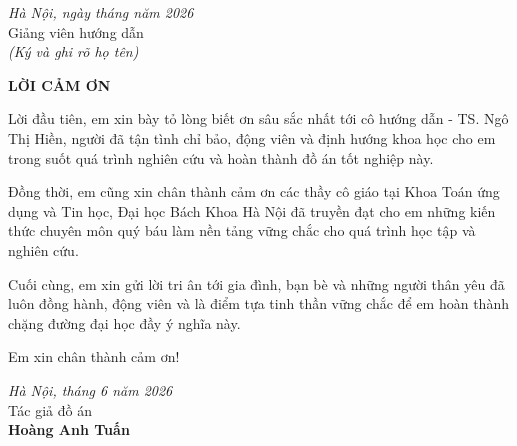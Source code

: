 ﻿\documentclass[../main.tex]{subfiles}
\begin{document}
\hfill
\begin{minipage}[t]{0.5\textwidth}
\noindent
\begin{center}
\vspace{1cm}
\textit{Hà Nội, ngày \hspace{0.5cm} tháng \hspace{0.5cm} năm 2026} \\
Giảng viên hướng dẫn\\
\textit{(Ký và ghi rõ họ tên)}\\ \vspace{3cm}
\end{center}	
\end{minipage}
\pagestyle{fancy}
\fancyhf{}
\fontsize{12pt}{14pt}\selectfont
\newpage
\begin{center}
    \Large{\textbf{LỜI CẢM ƠN}}\\
\end{center}
\vspace{1cm}
Lời đầu tiên, em xin bày tỏ lòng biết ơn sâu sắc nhất tới cô hướng dẫn - TS. Ngô Thị Hiền, người đã tận tình chỉ bảo, động viên và định hướng khoa học cho em trong suốt quá trình nghiên cứu và hoàn thành đồ án tốt nghiệp này.

Đồng thời, em cũng xin chân thành cảm ơn các thầy cô giáo tại Khoa Toán ứng dụng và Tin học, Đại học Bách Khoa Hà Nội đã truyền đạt cho em những kiến thức chuyên môn quý báu làm nền tảng vững chắc cho quá trình học tập và nghiên cứu.

Cuối cùng, em xin gửi lời tri ân tới gia đình, bạn bè và những người thân yêu đã luôn đồng hành, động viên và là điểm tựa tinh thần vững chắc để em hoàn thành chặng đường đại học đầy ý nghĩa này.

Em xin chân thành cảm ơn!


\hfill
\begin{minipage}[t]{0.5\textwidth}
\noindent
\begin{center}
\vspace{1cm}
\textit{Hà Nội, tháng 6 năm 2026} \\
Tác giả đồ án\\ \vspace{3cm}
\textbf{Hoàng Anh Tuấn}
\end{center}	
\end{minipage}
\end{document}
